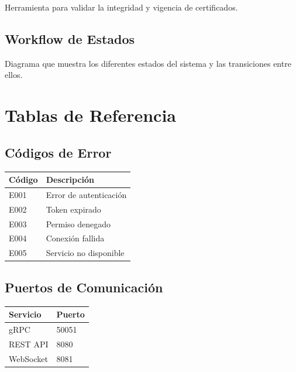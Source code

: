 Herramienta para validar la integridad y vigencia de certificados.

\subsection{Workflow de Estados}

Diagrama que muestra los diferentes estados del sistema y las transiciones entre ellos.

\section{Tablas de Referencia}

\subsection{Códigos de Error}

\begin{tabular}{ll}
\hline
Código & Descripción \\
\hline
E001 & Error de autenticación \\
E002 & Token expirado \\
E003 & Permiso denegado \\
E004 & Conexión fallida \\
E005 & Servicio no disponible \\
\hline
\end{tabular}

\subsection{Puertos de Comunicación}

\begin{tabular}{ll}
\hline
Servicio & Puerto \\
\hline
gRPC & 50051 \\
REST API & 8080 \\
WebSocket & 8081 \\
\hline
\end{tabular}

\clearpage
